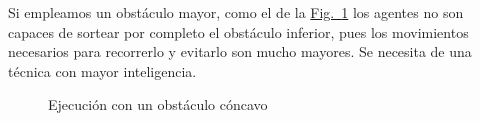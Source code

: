 \documentclass[runningheads]{llncs}
\newcommand{\refcruzada}[2]{\hyperref[#2]{#1~\ref{#2}}}
\begin{document}
    Si empleamos un obstáculo mayor, como el de la \refcruzada{Fig.}{fig:8} los agentes no son capaces de sortear por completo el obstáculo inferior, pues los movimientos necesarios para recorrerlo y evitarlo son mucho mayores. Se necesita de una técnica con mayor inteligencia.

    \begin{figure}[htbp]
        \centering
        \caption{Ejecución con un obstáculo cóncavo}
        \label{fig:8}
    \end{figure}
\end{document}
